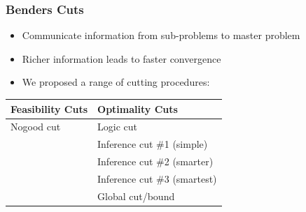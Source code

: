 \documentclass{beamer}
\begin{document}
\begin{frame}
\frametitle{Benders Cuts}
\begin{itemize}
	\item Communicate information from sub-problems to master problem\vspace{2mm}
	\item Richer information leads to faster convergence\vspace{2mm}\pause
	\item We proposed a range of cutting procedures:
\end{itemize}
\begin{table}[tpb]
	\def\arraystretch{1.2}
	\setlength{\tabcolsep}{3mm}
	\centering
	\begin{tabular}{ll}
		\toprule
		Feasibility Cuts & Optimality Cuts \\\midrule\midrule
		Nogood cut & Logic cut\\
		 & Inference cut \#1 (simple)\\
		 & Inference cut \#2 (smarter)\\
		 & Inference cut \#3 (smartest)\\
		 & Global cut/bound\\
		\bottomrule
	\end{tabular}
\end{table}
\end{frame}
\end{document}
